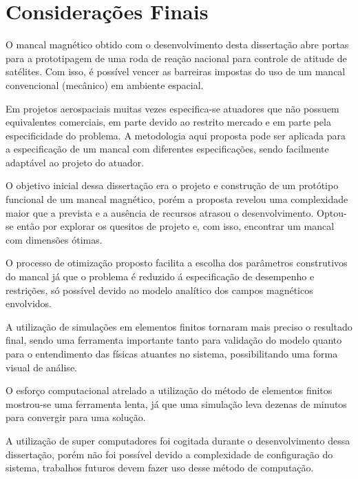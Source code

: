 \pagestyle{empty}
	\cleardoublepage
\pagestyle{fancy}

\chapter{Considerações Finais} \label{Cap:Consideracoes:Finais}

O mancal magnético obtido com o desenvolvimento desta dissertação abre portas para a prototipagem de uma roda de reação nacional para controle de atitude de satélites. Com isso, é possível vencer as barreiras impostas do uso de um mancal convencional (mecânico) em ambiente espacial.

Em projetos aerospaciais muitas vezes especifica-se atuadores que não possuem equivalentes comerciais, em parte devido ao restrito mercado e em parte pela especificidade do problema. A metodologia aqui proposta pode ser aplicada para a especificação de um mancal com diferentes especificações, sendo facilmente adaptável ao projeto do atuador. 

O objetivo inicial dessa dissertação era o projeto e construção de um protótipo funcional de um mancal magnético, porém a proposta revelou uma complexidade maior que a prevista e a ausência de recursos atrasou o desenvolvimento. Optou-se então por explorar os quesitos de projeto e, com isso, encontrar um mancal com dimensões ótimas. 

O processo de otimização proposto facilita a escolha dos parâmetros construtivos do mancal já que o problema é reduzido á especificação de desempenho e restrições, só possível devido ao modelo analítico dos campos magnéticos envolvidos.

A utilização de simulações em elementos finitos tornaram mais preciso o resultado final, sendo uma ferramenta importante tanto para validação do modelo quanto para o entendimento das físicas atuantes no sistema, possibilitando uma forma visual de análise. 

O esforço computacional atrelado a utilização do método de elementos finitos mostrou-se uma ferramenta lenta, já que uma simulação leva dezenas de minutos para convergir para uma solução.

A utilização de super computadores foi cogitada durante o desenvolvimento dessa dissertação, porém não foi possível devido a complexidade de configuração do sistema, trabalhos futuros devem fazer uso desse método de computação.

